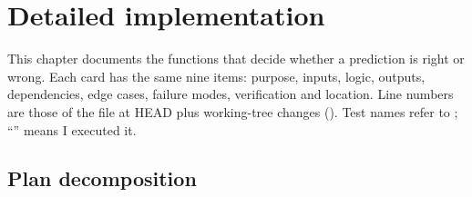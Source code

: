 \chapter{Detailed implementation}\label{ch:impl}

This chapter documents the functions that decide whether a prediction is right or wrong. Each card has
the same nine items: purpose, inputs, logic, outputs, dependencies, edge cases, failure modes,
verification and location. Line numbers are those of the file at HEAD plus working-tree changes
(\evCODE). Test names refer to ; ``\evRUN'' means I executed it.

\section{Plan decomposition}

